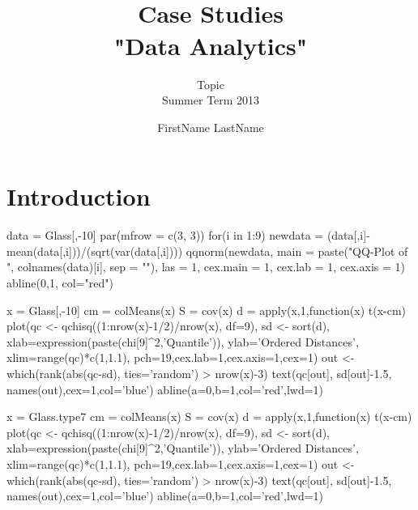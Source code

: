 \documentclass[a4paper, 12pt, titlepage, headsepline, listof = totoc, bibliography = totoc, numbers = noenddot]{scrartcl}
\title{\hrulefill \\ \vspace*{1cm} Case Studies\\\vspace*{0.5cm}
 "Data Analytics" \\ \vspace*{1cm}\hrulefill\vspace*{1.5cm}}
\subtitle{Topic\\\vspace*{1.5cm} Summer Term 2013\vspace*{1.5cm}}
\author{FirstName LastName}
\begin{document}

\thispagestyle{empty}
\maketitle


\thispagestyle{empty}
\tableofcontents


\newpage
\setcounter{page}{1}
\section{Introduction}

\begin{Schunk}
\begin{Sinput}
 data = Glass[,-10]
 par(mfrow = c(3, 3))
 for(i in 1:9){
 	newdata = (data[,i]-mean(data[,i]))/(sqrt(var(data[,i])))
 	qqnorm(newdata, 
 			main = paste("QQ-Plot of ", colnames(data)[i], sep = ""),
 			las = 1,
 			cex.main = 1, cex.lab = 1, cex.axis = 1)
 	abline(0,1, col="red")
 }
\end{Sinput}
\end{Schunk}


\begin{Schunk}
\begin{Sinput}
 x = Glass[,-10]
 cm = colMeans(x)
 S = cov(x)
 d = apply(x,1,function(x) t(x-cm) %*% solve(S) %*% (x-cm))
 plot(qc <- qchisq((1:nrow(x)-1/2)/nrow(x), df=9),
      sd <- sort(d), xlab=expression(paste(chi[9]^2,'Quantile')),
      ylab='Ordered Distances', xlim=range(qc)*c(1,1.1),
      pch=19,cex.lab=1,cex.axis=1,cex=1)
 out <- which(rank(abs(qc-sd), ties='random') > nrow(x)-3)
 text(qc[out], sd[out]-1.5, names(out),cex=1,col='blue')
 abline(a=0,b=1,col='red',lwd=1)
\end{Sinput}
\end{Schunk}

\begin{Schunk}
\begin{Sinput}
 x = Glass.type7
 cm = colMeans(x)
 S = cov(x)
 d = apply(x,1,function(x) t(x-cm) %*% solve(S) %*% (x-cm))
 plot(qc <- qchisq((1:nrow(x)-1/2)/nrow(x), df=9),
      sd <- sort(d), xlab=expression(paste(chi[9]^2,'Quantile')),
      ylab='Ordered Distances', xlim=range(qc)*c(1,1.1),
      pch=19,cex.lab=1,cex.axis=1,cex=1)
 out <- which(rank(abs(qc-sd), ties='random') > nrow(x)-3)
 text(qc[out], sd[out]-1.5, names(out),cex=1,col='blue')
 abline(a=0,b=1,col='red',lwd=1)
\end{Sinput}
\end{Schunk}
\end{document}
